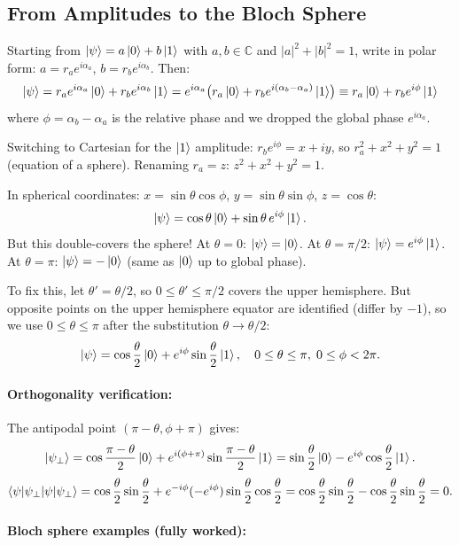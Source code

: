 \documentclass[10pt,a4paper]{article}
\begin{document}
\subsection{From Amplitudes to the Bloch Sphere}

Starting from $\ket{\psi}=a\ket{0}+b\ket{1}$ with $a,b\in\mathbb{C}$ and $|a|^2+|b|^2=1$, write in polar form: $a=r_ae^{i\alpha_a}$, $b=r_be^{i\alpha_b}$. Then:
\[
\ket{\psi}=r_ae^{i\alpha_a}\ket{0}+r_be^{i\alpha_b}\ket{1}=e^{i\alpha_a}\bigl(r_a\ket{0}+r_be^{i(\alpha_b-\alpha_a)}\ket{1}\bigr)\equiv r_a\ket{0}+r_be^{i\phi}\ket{1}
\]
where $\phi=\alpha_b-\alpha_a$ is the relative phase and we dropped the global phase $e^{i\alpha_a}$.

Switching to Cartesian for the $\ket{1}$ amplitude: $r_be^{i\phi}=x+iy$, so $r_a^2+x^2+y^2=1$ (equation of a sphere). Renaming $r_a=z$: $z^2+x^2+y^2=1$.

In spherical coordinates: $x=\sin\theta\cos\phi$, $y=\sin\theta\sin\phi$, $z=\cos\theta$:
\[
\ket{\psi}=\cos\theta\ket{0}+\sin\theta\,e^{i\phi}\ket{1}.
\]
But this double-covers the sphere! At $\theta=0$: $\ket{\psi}=\ket{0}$. At $\theta=\pi/2$: $\ket{\psi}=e^{i\phi}\ket{1}$. At $\theta=\pi$: $\ket{\psi}=-\ket{0}$ (same as $\ket{0}$ up to global phase).

To fix this, let $\theta'=\theta/2$, so $0\le\theta'\le\pi/2$ covers the upper hemisphere. But opposite points on the upper hemisphere equator are identified (differ by $-1$), so we use $0\le\theta\le\pi$ after the substitution $\theta\to\theta/2$:
\[
\ket{\psi}=\cos\frac{\theta}{2}\ket{0}+e^{i\phi}\sin\frac{\theta}{2}\ket{1},\quad 0\le\theta\le\pi,\; 0\le\phi<2\pi.
\]

\paragraph{Orthogonality verification:} The antipodal point $(\pi-\theta,\phi+\pi)$ gives:
\[
\ket{\psi_\perp}=\cos\frac{\pi-\theta}{2}\ket{0}+e^{i(\phi+\pi)}\sin\frac{\pi-\theta}{2}\ket{1}=\sin\frac{\theta}{2}\ket{0}-e^{i\phi}\cos\frac{\theta}{2}\ket{1}.
\]
\[
\braket{\psi|\psi_\perp}=\cos\frac{\theta}{2}\sin\frac{\theta}{2}+e^{-i\phi}(-e^{i\phi})\sin\frac{\theta}{2}\cos\frac{\theta}{2}=\cos\frac{\theta}{2}\sin\frac{\theta}{2}-\cos\frac{\theta}{2}\sin\frac{\theta}{2}=0.
\]

\paragraph{Bloch sphere examples (fully worked):}
\end{document}
